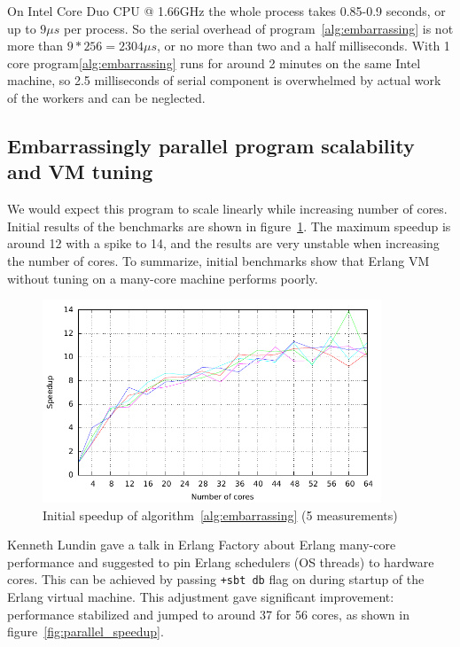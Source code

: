 \documentclass[english,11pt]{l4proj}
\begin{document}
On Intel Core Duo CPU @ 1.66GHz the whole process takes 0.85-0.9 seconds, or up
to $9\mu s$ per process. So the serial overhead of
program~\ref{alg:embarrassing} is not more than $9*256 = 2304 \mu s$, or no more
than two and a half milliseconds. With 1 core program\ref{alg:embarrassing} runs
for around 2 minutes on the same Intel machine, so 2.5 milliseconds of serial
component is overwhelmed by actual work of the workers and can be neglected.

\subsection{Embarrassingly parallel program scalability and VM tuning}

We would expect this program to scale linearly while increasing number of cores.
Initial results of the benchmarks are shown in figure~\ref{fig:bad_speedup}.
The maximum speedup is around 12 with a spike to 14, and the results are very
unstable when increasing the number of cores. To summarize, initial benchmarks
show that Erlang VM without tuning on a many-core machine performs poorly.

\begin{figure}
    \centering
    \includegraphics[width=0.9\textwidth]{images/bad_speedup.pdf}
    \caption{Initial speedup of algorithm~\ref{alg:embarrassing} (5 measurements)}
    \label{fig:bad_speedup}
\end{figure}

Kenneth Lundin gave a talk in Erlang Factory\cite{lundin-smp} about Erlang
many-core performance and suggested to pin Erlang schedulers (OS threads) to
hardware cores. This can be achieved by passing {\tt +sbt db} flag on during
startup of the Erlang virtual machine. This adjustment gave significant
improvement: performance stabilized and jumped to around 37 for 56 cores, as
shown in figure~\ref{fig:parallel_speedup}.
\end{document}
